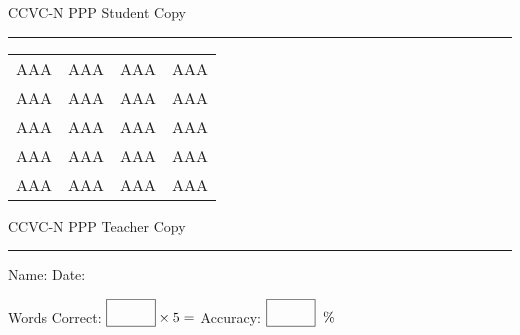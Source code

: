 \documentclass{memoir}
\begin{document}

\footnotesize \noindent
CCVC-N PPP \hfill Student Copy
\smallskip
\hrule

\Large

\setlength{\tabcolsep}{14pt}
\def\arraystretch{3}

{\selectfont


\begin{vplace}[0.5]
\begin{center}
\begin{tabular}{cccc}
AAA & AAA & AAA & AAA \\
AAA & AAA & AAA & AAA \\
AAA & AAA & AAA & AAA \\
AAA & AAA & AAA & AAA \\
AAA & AAA & AAA & AAA \\
\end{tabular}
\end{center}
\end{vplace}

}

\newpage

\footnotesize \noindent
CCVC-N PPP \hfill Teacher Copy
\smallskip
\hrule

\small

\vfill

\noindent
Name: \underline{\hspace{1.75in}} \hfill Date: \underline{\hspace{1in}}

\Large

{\selectfont



}

\small

Words Correct: $\fbox{\phantom{\huge 100}} \times 5 = $ Accuracy: $\fbox{\phantom{\huge 100}}\;\; \%$ 

\vfill

\end{document}
